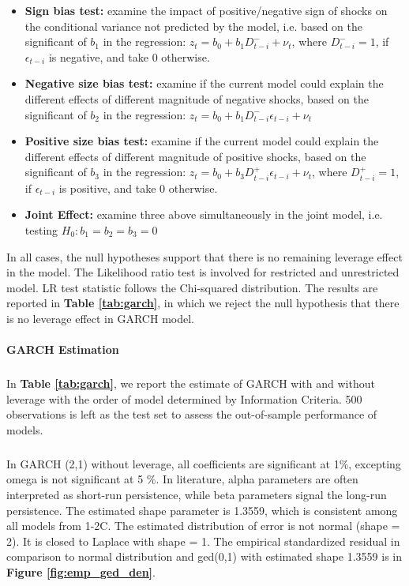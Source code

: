 \documentclass[a4paper]{article}
\begin{document}
\begin{itemize}
\item \textbf{Sign bias test:} examine the impact of positive/negative sign of shocks on the conditional variance not predicted by the model, i.e. based on the significant of $b_1$ in the regression: $z_{t} = b_0 + b_1 D_{t-i}^{-} + \nu_t$, where $D_{t-i}^{-} = 1$, if $\epsilon_{t-i}$ is negative, and take 0 otherwise.

\item \textbf{Negative size bias test:} examine if the current model could explain the different effects of different magnitude of negative shocks, based on the significant of $b_2$ in the regression: $z_{t} = b_0 + b_1 D_{t-i}^{-} \epsilon_{t-i} + \nu_t$ 

\item \textbf{Positive size bias test:} examine if the current model could explain the different effects of different magnitude of positive shocks, based on the significant of $b_3$ in the regression: $z_{t} = b_0 + b_3 D_{t-i}^{+} \epsilon_{t-i} + \nu_t$, where $D_{t-i}^{+} = 1$, if $\epsilon_{t-i}$ is positive, and take 0 otherwise.

\item \textbf{Joint Effect:} examine three above simultaneously in the joint model, i.e. testing $H_0: b_1 = b_2 = b_3 = 0$
\end{itemize}

In all cases, the null hypotheses support that there is no remaining leverage effect in the model. The Likelihood ratio test is involved for restricted and unrestricted model. LR test statistic follows the Chi-squared distribution. The results are reported in \textbf{Table \ref{tab:garch}}, in which we reject the null hypothesis that there is no leverage effect in GARCH model.



\paragraph{GARCH Estimation}
\subparagraph*{}
In \textbf{Table \ref{tab:garch}}, we report the estimate of GARCH with and without leverage with the order of model determined by Information Criteria. 500 observations is left as the test set to assess the out-of-sample performance of models.


\subparagraph*{}
In GARCH (2,1) without leverage, all coefficients are significant at 1\%, excepting omega is not significant at 5 \%. In literature, alpha parameters are often interpreted as short-run persistence, while beta parameters signal the long-run persistence. The estimated shape parameter is 1.3559, which is consistent among all models from 1-2C. The estimated distribution of error is not normal (shape = 2). It is closed to Laplace with shape = 1. The empirical standardized residual in comparison to normal distribution and ged(0,1) with estimated shape 1.3559 is in \textbf{Figure \ref{fig:emp_ged_den}}. \\
\end{document}
